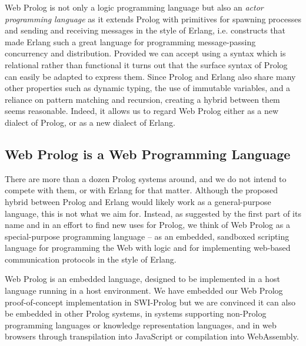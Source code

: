 \documentclass{tlp}
\begin{document}
Web Prolog is not only a logic programming language but also an \textit{actor programming language} as it extends Prolog with primitives for spawning processes and sending and receiving messages in the style of Erlang, i.e. constructs that made Erlang such a great language for programming message-passing concurrency and distribution. Provided we can accept using a syntax which is relational rather than functional it turns out that the surface syntax of Prolog can easily be adapted to express them. Since Prolog and Erlang also share many other properties such as dynamic typing, the use of immutable variables, and a reliance on pattern matching and recursion, creating a hybrid between them seems reasonable. Indeed, it allows us to regard Web Prolog either as a new dialect of Prolog, or as a new dialect of Erlang.

\vspace{-2mm}

\subsection{Web Prolog is a Web Programming Language}\label{sec:hybrid}

There are more than a dozen Prolog systems around, and we do not intend to compete with them, or with Erlang for that matter. Although the proposed hybrid between Prolog and Erlang would likely work as a general-purpose language, this is not what we aim for. Instead, as suggested by the first part of its name and in an effort to find new uses for Prolog, we think of Web Prolog as a special-purpose programming language -- as an embedded, sandboxed scripting language for programming the Web with logic and for implementing web-based communication protocols in the style of Erlang.


Web Prolog is an embedded language, designed to be implemented in a host language running in a host environment. We have embedded our Web Prolog proof-of-concept implementation in SWI-Prolog \cite{wielemaker:2011:tplp} but we are convinced it can also be embedded in other Prolog systems, in systems supporting non-Prolog programming languages or knowledge representation languages, and in web browsers through transpilation into JavaScript or compilation into WebAssembly.
\end{document}
